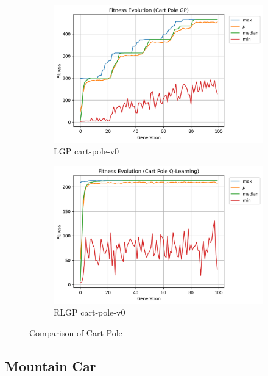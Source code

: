 \documentclass[12pt, final]{dalcsthesis}
\begin{document}
\begin{figure}[hb]
	\centering
	\begin{subfigure}{1.0\textwidth}
		\includegraphics[width=\linewidth]{cart_pole_lgp.png}
		\caption{LGP cart-pole-v0}
		\label{fig:cart-pole-lgp}
	\end{subfigure}
	\hfill
	\begin{subfigure}{1.0\textwidth}
		\includegraphics[width=\linewidth]{cart_pole_q.png}
		\caption{RLGP cart-pole-v0}
		\label{fig:cart-pole-q}
	\end{subfigure}
	\caption{Comparison of Cart Pole}
	\label{fig:cart-pole-comparison}
\end{figure}


\subsection{Mountain Car}
\end{document}
